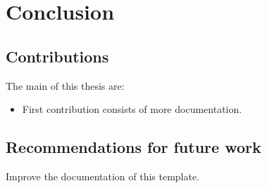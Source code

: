 \chapter{Conclusion}
\label{c:conclusion}

\begin{emphasize}
\end{emphasize}

\section{Contributions}

The main  of this thesis are:

\begin{itemize}
    \item First contribution consists of more documentation.
\end{itemize}

\section{Recommendations for future work}
Improve the documentation of this template.
